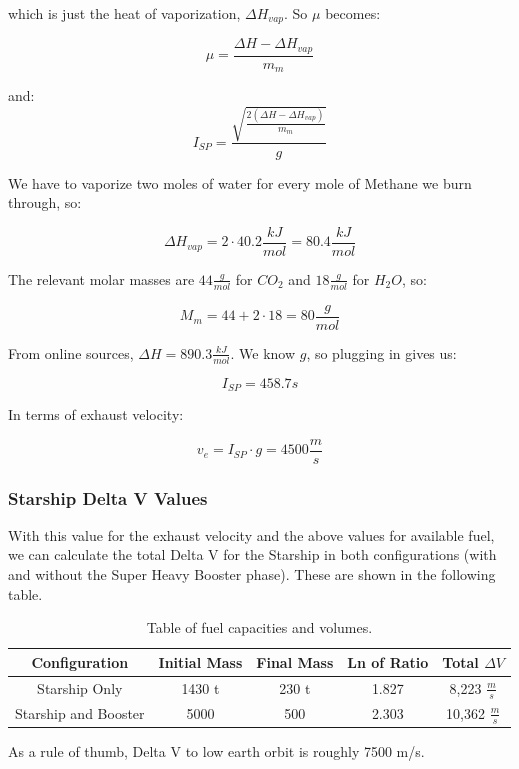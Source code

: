 \documentclass[11pt]{article}
\begin{document}
which is just the heat of vaporization, $\Delta H_{vap}$. So $\mu$ becomes:

\[\mu=\frac{\Delta H-\Delta H_{vap}}{m_m}\]

and:
\[I_{SP}=\frac{\sqrt{\frac{2(\Delta H-\Delta H_{vap})}{m_m}}}{g}\]

We have to vaporize two moles of water for every mole of Methane we burn through, so:

\[\Delta H_{vap}=2 \cdot 40.2 \frac{kJ}{mol} = 80.4 \frac{kJ}{mol}\]  
\newline

The relevant molar masses are $44 \frac{g}{mol}$ for $CO_2$ and $18 \frac{g}{mol}$ for $H_2O$, so:

\[M_m=44+2\cdot18=80 \frac{g}{mol}\] 

From online sources, $\Delta H = 890.3 \frac{kJ}{mol}$. We know $g$, so plugging in gives us:

\[I_{SP} = 458.7 s\]

In terms of exhaust velocity:

\[v_e = I_{SP} \cdot g = 4500 \frac{m}{s}\]

\subsubsection{Starship Delta V Values}

With this value for the exhaust velocity and the above values for available fuel, we can calculate the total Delta V for the Starship in both configurations (with and without the Super Heavy Booster phase). These are shown in the following table.  
\newline

\begin{table}[H]
\begin{center}
\begin{tabular}{||c c c c c||} 
 \hline
 Configuration & Initial Mass & Final Mass & Ln of Ratio & Total $\Delta V$ \\ [0.5ex]
 \hline
 Starship Only & 1430 t & 230 t & 1.827 &  8,223 $\frac{m}{s}$  \\ 
 \hline
 Starship and Booster & 5000 & 500 & 2.303 & 10,362 $\frac{m}{s}$  \\
 \hline
 
\end{tabular}
\caption{\label{FuelSpecs02}Table of fuel capacities and volumes.}
\end{center}
\end{table} 

As a rule of thumb, Delta V to low earth orbit is roughly 7500 m/s. 

\newpage




\end{document}
